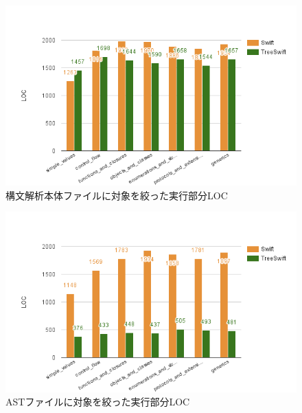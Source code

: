 \begin{figure}
    \begin{center}
        \includegraphics[scale=0.8]{./img/parse_loc_result.png}
        \caption{構文解析本体ファイルに対象を絞った実行部分LOC}
        \label{img:parse-loc-result}
    \end{center}
\end{figure}

\begin{figure}
    \begin{center}
        \includegraphics[scale=0.8]{./img/ast_loc_result.png}
        \caption{ASTファイルに対象を絞った実行部分LOC}
        \label{img:ast-loc-result}
    \end{center}
\end{figure}

